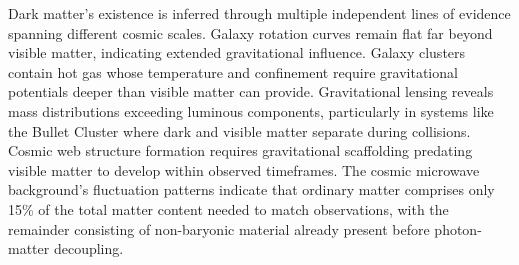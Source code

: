 Dark matter's existence is inferred through multiple independent lines of evidence spanning different cosmic scales. Galaxy rotation curves remain flat far beyond visible matter, indicating extended gravitational influence. Galaxy clusters contain hot gas whose temperature and confinement require gravitational potentials deeper than visible matter can provide. Gravitational lensing reveals mass distributions exceeding luminous components, particularly in systems like the Bullet Cluster where dark and visible matter separate during collisions. Cosmic web structure formation requires gravitational scaffolding predating visible matter to develop within observed timeframes. The cosmic microwave background's fluctuation patterns indicate that ordinary matter comprises only 15\% of the total matter content needed to match observations, with the remainder consisting of non-baryonic material already present before photon-matter decoupling.
